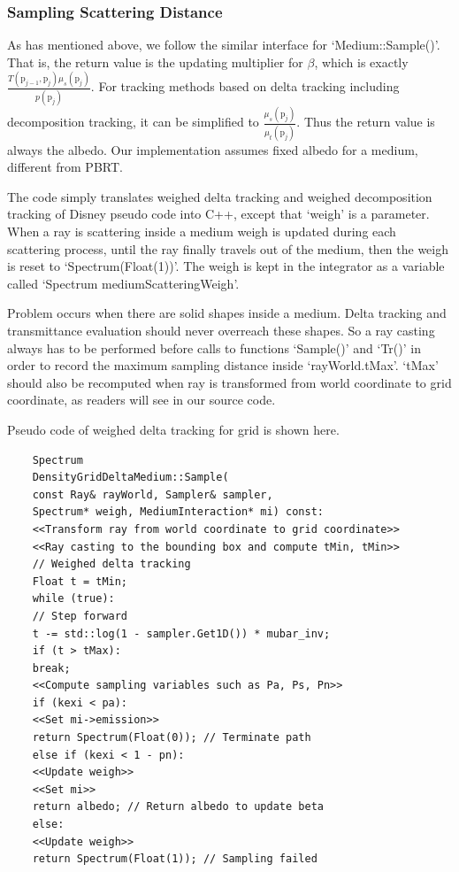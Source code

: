 \documentclass[acmtog]{acmart}
\def\p{\mathrm{p}}
\begin{document}
\subsubsection{Sampling Scattering Distance}
As has mentioned above, we follow the similar interface for `Medium::Sample()'.
That is, the return value is the updating multiplier for $\beta$, which is exactly $\frac{T(\p_{j-1},\p_j)\mu_s(\p_j)}{p({\p_j})}$.
For tracking methods based on delta tracking including decomposition tracking, it can be simplified to $\frac{\mu_s(\p_j)}{\mu_t(\p_j)}$.
Thus the return value is always the albedo.
Our implementation assumes fixed albedo for a medium, different from PBRT.\par
The code simply translates weighed delta tracking and weighed decomposition tracking of Disney pseudo code into C++, 
except that `weigh' is a parameter.
When a ray is scattering inside a medium weigh is updated during each scattering process, 
until the ray finally travels out of the medium, then the weigh is reset to `Spectrum(Float(1))'.
The weigh is kept in the integrator as a variable called `Spectrum mediumScatteringWeigh'.\par
Problem occurs when there are solid shapes inside a medium.
Delta tracking and transmittance evaluation should never overreach these shapes.
So a ray casting always has to be performed before calls to functions `Sample()' and `Tr()' in order to record the maximum sampling distance inside `rayWorld.tMax'.
`tMax' should also be recomputed when ray is transformed from world coordinate to grid coordinate, as readers will see in our source code.\par
Pseudo code of weighed delta tracking for grid is shown here.
\lstset{basicstyle=\tiny\ttfamily}
\begin{lstlisting}
	Spectrum
	DensityGridDeltaMedium::Sample(
	const Ray& rayWorld, Sampler& sampler, 
	Spectrum* weigh, MediumInteraction* mi) const:
	<<Transform ray from world coordinate to grid coordinate>>
	<<Ray casting to the bounding box and compute tMin, tMin>>
	// Weighed delta tracking
	Float t = tMin;
	while (true):
	// Step forward
	t -= std::log(1 - sampler.Get1D()) * mubar_inv;
	if (t > tMax):
	break;
	<<Compute sampling variables such as Pa, Ps, Pn>>
	if (kexi < pa):
	<<Set mi->emission>>
	return Spectrum(Float(0)); // Terminate path
	else if (kexi < 1 - pn):
	<<Update weigh>>
	<<Set mi>>
	return albedo; // Return albedo to update beta
	else:
	<<Update weigh>>
	return Spectrum(Float(1)); // Sampling failed
\end{lstlisting}
\end{document}
